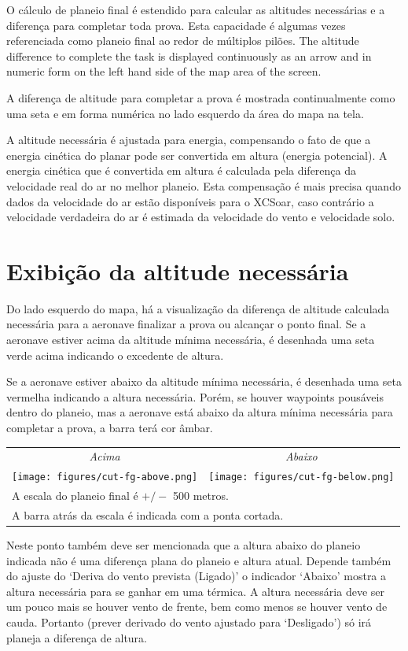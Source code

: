 O cálculo de planeio final é estendido para calcular as altitudes necessárias e a diferença para completar toda prova.  Esta capacidade é algumas vezes referenciada como planeio final ao redor de múltiplos pilões.  
The altitude difference to complete the task is displayed continuously
as an arrow and in numeric form on the left hand side of the map area
of the screen.

A diferença de altitude para completar a prova é mostrada continualmente como uma seta e em forma numérica no lado esquerdo da área do mapa na tela.

A altitude necessária é ajustada para energia, compensando o fato de que a energia cinética do planar pode ser convertida em altura (energia potencial).  A energia cinética que é convertida em altura é calculada pela diferença da velocidade real do ar no melhor planeio.  Esta compensação é mais precisa quando dados da velocidade do ar estão disponíveis para o XCSoar, caso contrário a velocidade verdadeira do ar é estimada da velocidade do vento e velocidade solo.


\section{Exibição da altitude necessária}

Do lado esquerdo do mapa, há a visualização da diferença de altitude calculada necessária para a aeronave finalizar a prova ou alcançar o ponto final.  Se a aeronave estiver acima da altitude mínima necessária, é desenhada uma seta verde acima indicando o excedente de altura.

Se a aeronave estiver abaixo da altitude mínima necessária, é desenhada uma seta vermelha indicando a altura necessária.  Porém, se houver waypoints pousáveis dentro do planeio, mas a aeronave está abaixo da altura mínima necessária para completar a prova, a barra terá cor âmbar.

\begin{center}
\begin{tabular}{c c}
{\it Acima} & {\it Abaixo} \\
\texttt{[image: figures/cut-fg-above.png]} &
\texttt{[image: figures/cut-fg-below.png]} \\
\multicolumn{2}{l}{A escala do planeio final é $+/-$ 500 metros.} \\
\multicolumn{2}{l}{A barra atrás da escala é indicada com a ponta cortada.}
\end{tabular}
\end{center}
\tip
Neste ponto também deve ser mencionada que a altura abaixo do planeio indicada não é uma diferença plana do planeio e altura atual.  Depende também do ajuste do ‘Deriva do vento prevista (Ligado)’ o indicador ‘Abaixo’ mostra a altura necessária para se ganhar em uma térmica.  
A altura necessária deve ser um pouco mais se houver vento de frente, bem como menos se houver vento de cauda.  Portanto (prever derivado do vento ajustado para ‘Desligado’) só irá planeja a diferença de altura.
 


